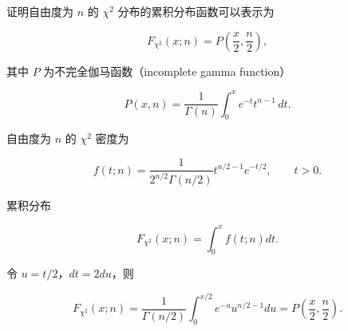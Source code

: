 \begin{question}
证明自由度为 \(n\) 的 \(\chi^2\) 分布的累积分布函数可以表示为

\[
F_{\chi^2}(x;n)=P\left(\frac{x}{2},\frac{n}{2}\right),
\]

其中 \(P\) 为不完全伽马函数（incomplete gamma function）

\[
P(x,n)=\frac{1}{\Gamma(n)}\int_0^x e^{-t}t^{n-1}\,dt.
\]
\begin{solution}
自由度为 \(n\) 的 \(\chi^2\) 密度为

\[
f(t;n)=\frac{1}{2^{n/2}\Gamma(n/2)}t^{n/2-1}e^{-t/2},\qquad t>0.
\]

累积分布

\[
F_{\chi^2}(x;n)=\int_0^x f(t;n)dt.
\]

令 \(u=t/2\)，\(dt=2du\)，则

\[
F_{\chi^2}(x;n)=\frac{1}{\Gamma(n/2)}\int_0^{x/2}e^{-u}u^{n/2-1}du
=P\left(\frac{x}{2},\frac{n}{2}\right).
\]
\end{solution}
\end{question}

